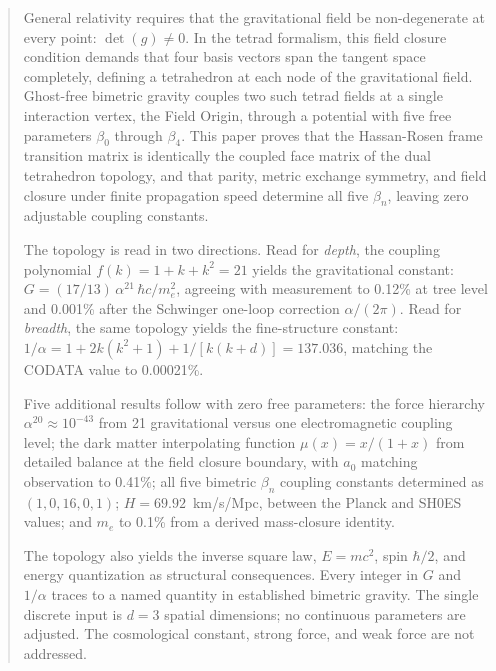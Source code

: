 \documentclass[aps,prd,preprint,superscriptaddress,showpacs,preprintnumbers,amsmath,amssymb,nofootinbib]{revtex4-2}
\begin{document}
\begin{abstract}
General relativity requires that the gravitational field be non-degenerate at every point: $\det(g) \neq 0$. In the tetrad formalism, this field closure condition demands that four basis vectors span the tangent space completely, defining a tetrahedron at each node of the gravitational field. Ghost-free bimetric gravity couples two such tetrad fields at a single interaction vertex, the Field Origin, through a potential with five free parameters $\beta_0$ through $\beta_4$. This paper proves that the Hassan-Rosen frame transition matrix is identically the coupled face matrix of the dual tetrahedron topology, and that parity, metric exchange symmetry, and field closure under finite propagation speed determine all five $\beta_n$, leaving zero adjustable coupling constants.

The topology is read in two directions. Read for \emph{depth}, the coupling polynomial $f(k) = 1 + k + k^2 = 21$ yields the gravitational constant: $G = (17/13)\,\alpha^{21}\,\hbar c / m_e^2$, agreeing with measurement to 0.12\% at tree level and 0.001\% after the Schwinger one-loop correction $\alpha/(2\pi)$. Read for \emph{breadth}, the same topology yields the fine-structure constant: $1/\alpha = 1 + 2k(k^2+1) + 1/[k(k+d)] = 137.036$, matching the CODATA value to 0.00021\%.

Five additional results follow with zero free parameters: the force hierarchy $\alpha^{20} \approx 10^{-43}$ from 21 gravitational versus one electromagnetic coupling level; the dark matter interpolating function $\mu(x) = x/(1{+}x)$ from detailed balance at the field closure boundary, with $a_0$ matching observation to 0.41\%; all five bimetric $\beta_n$ coupling constants determined as $(1, 0, 16, 0, 1)$; $H = 69.92$~km/s/Mpc, between the Planck and SH0ES values; and $m_e$ to 0.1\% from a derived mass-closure identity.

The topology also yields the inverse square law, $E = mc^2$, spin $\hbar/2$, and energy quantization as structural consequences. Every integer in $G$ and $1/\alpha$ traces to a named quantity in established bimetric gravity. The single discrete input is $d = 3$ spatial dimensions; no continuous parameters are adjusted. The cosmological constant, strong force, and weak force are not addressed.
\end{abstract}

\end{document}
